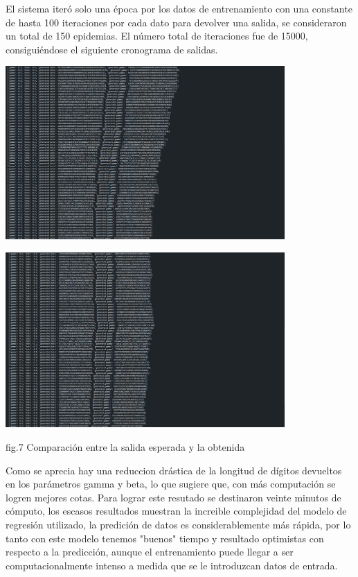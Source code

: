     El sistema iteró solo una época por los datos de entrenamiento con una constante de hasta 100 iteraciones por cada dato para devolver una salida, se consideraron
    un total de 150 epidemias. El número total de iteraciones fue de 15000, consiguiéndose el siguiente cronograma de salidas.

    \begin{center}
        
        \includegraphics[width=0.8\textwidth]{images/1.png}

        \includegraphics[width=0.8\textwidth]{images/2.png}
        
        \begin{center}
            fig.7 Comparación entre la salida esperada y la obtenida
        \end{center} 

\end{center}

Como se aprecia hay una reduccion drástica de la longitud de dígitos devueltos en los parámetros gamma y beta, lo que sugiere que, con más computación se logren 
mejores cotas. Para lograr este resutado se destinaron veinte minutos de cómputo, los escasos resultados muestran la increible 
complejidad del modelo de regresión utilizado, la predición de datos es considerablemente más rápida, por lo tanto con este modelo tenemos "buenos" tiempo 
y resultado optimistas con respecto a la predicción, aunque el entrenamiento puede llegar a ser computacionalmente intenso a medida que se le introduzcan datos de entrada.

